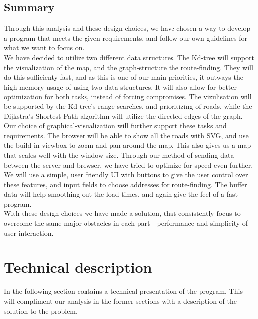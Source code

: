 \documentclass[a4paper,10pt,titlepage]{article}
\begin{document}
				
		\subsection{Summary}
Through this analysis and these design choices, we have chosen a way to develop a program that meets the given requirements, and follow our own guidelines for what we want to focus on.\\
We have decided to utilize two different data structures. The Kd-tree will support the visualization of the map, and the graph-structure the route-finding. They will do this sufficienty fast, and as this is one of our main priorities, it outways the high memory usage of using two data structures. It will also allow for better optimization for both tasks, instead of forcing compromises. The vizulisation will be supported by the Kd-tree's range searches, and prioritizing of roads, while the Dijkstra's Shortest-Path-algorithm will utilize the directed edges of the graph.\\
Our choice of graphical-visualization will further support these tasks and requirements. The browser will be able to show all the roads with SVG, and use the build in viewbox to zoom and pan around the map. This also gives us a map that scales well with the window size. Through our method of sending data between the server and browser, we have tried to optimize for speed even further.\\
We will use a simple, user friendly UI with buttons to give the user control over these features, and input fields to choose addresses for route-finding. The buffer data will help smoothing out the load times, and again give the feel of a fast program.\\
With these design choices we have made a solution, that consistently focus to overcome the same major obstacles in each part - performance and simplicity of user interaction.
			
	\newpage		
	\section{Technical description}
		In the following section contains a technical presentation of the program. This will compliment our analysis in the former sections with a description of the solution to the problem.
		
\end{document}
